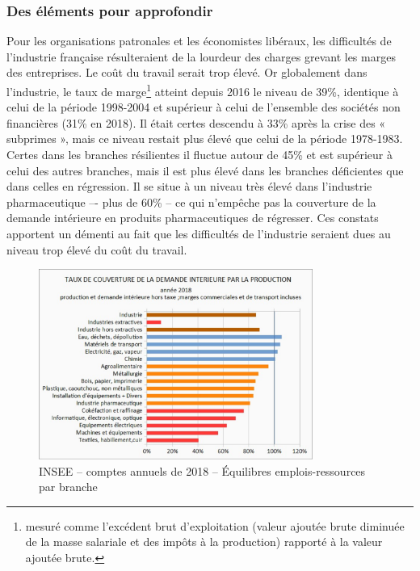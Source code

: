 \documentclass[a4paper]{article}
\begin{document}
\subsubsection{Des éléments pour approfondir}

Pour les organisations patronales et les économistes libéraux, les difficultés de l’industrie française résulteraient de la lourdeur des charges grevant les marges des entreprises. Le coût du travail serait trop élevé. Or globalement dans l’industrie, le taux de marge\footnote{mesuré comme l’excédent brut d’exploitation (valeur ajoutée brute diminuée de la masse salariale et des impôts à la production) rapporté à la valeur ajoutée brute.} atteint depuis 2016 le niveau de 39\%, identique à celui de la période 1998-2004 et supérieur à celui de l’ensemble des sociétés non financières (31\% en 2018). Il était certes descendu à 33\% après la crise des « subprimes », mais ce niveau restait plus élevé que celui de la période 1978-1983.  Certes dans les branches résilientes il fluctue autour de 45\% et est supérieur à celui des autres branches, mais il est plus élevé dans les branches déficientes que dans celles en régression. Il se situe à un niveau très élevé dans l’industrie pharmaceutique –- plus de 60\% -- ce qui n’empêche pas la couverture de la demande intérieure en produits pharmaceutiques de régresser. Ces constats apportent un démenti au fait que les difficultés de l’industrie seraient dues au niveau trop élevé du coût du travail.

\begin{figure}[H]
    \centering
    \includegraphics*[width=0.8\textwidth]{images/couverture}
    \caption{INSEE – comptes annuels de 2018 – Équilibres emplois-ressources par branche}
    \label{fig:couverture}
\end{figure}
\end{document}
